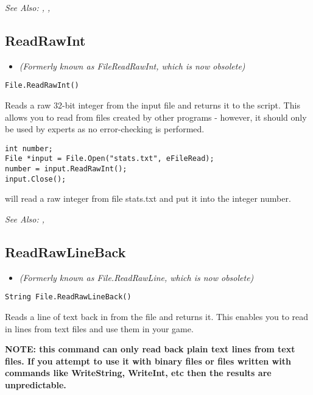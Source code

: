 \it{See Also:} , ,


\subsection{ReadRawInt}\label{File.ReadRawInt}%

\begin{itemize}
\item \it{(Formerly known as FileReadRawInt, which is now obsolete)}
\end{itemize}

\begin{verbatim}
File.ReadRawInt()
\end{verbatim}
Reads a raw 32-bit integer from the input file and returns it to the script.
This allows you to read from files created by other programs - however, it
should only be used by experts as no error-checking is performed.

\begin{verbatim}
int number;
File *input = File.Open("stats.txt", eFileRead);
number = input.ReadRawInt();
input.Close();
\end{verbatim}
will read a raw integer from file stats.txt and put it into the integer number.

\it{See Also:} , 


\subsection{ReadRawLineBack}\label{File.ReadRawLineBack}%

\begin{itemize}
\item \it{(Formerly known as File.ReadRawLine, which is now obsolete)}
\end{itemize}

\begin{verbatim}
String File.ReadRawLineBack()
\end{verbatim}
Reads a line of text back in from the file and returns it. This enables you to
read in lines from text files and use them in your game.

\bf{NOTE:} this command can only read back plain text lines from text files. If you
attempt to use it with binary files or files written with commands like WriteString,
WriteInt, etc then the results are unpredictable.

